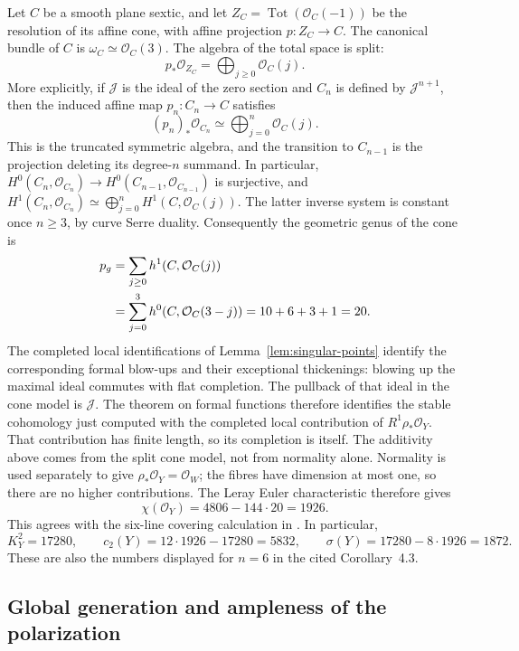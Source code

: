 \documentclass[11pt,reqno]{amsart}
\numberwithin{equation}{section}
\theoremstyle{definition}
\theoremstyle{remark}
\newcommand{\OO}{\mathcal O}
\newcommand{\Tot}{\operatorname{Tot}}
\begin{document}
Let $C$ be a smooth plane sextic, and let
$Z_C=\Tot(\OO_C(-1))$ be the resolution of its affine cone, with affine
projection $p:Z_C\to C$. The canonical bundle of $C$ is
$\omega_C\simeq\OO_C(3)$. The algebra of the total space is split:
\[
 p_*\OO_{Z_C}=\bigoplus_{j\geq0}\OO_C(j).
\]
More explicitly, if $\mathcal J$ is the ideal of the zero section and
$C_n$ is defined by $\mathcal J^{n+1}$, then the induced affine map
$p_n:C_n\to C$ satisfies
\[
 (p_n)_*\OO_{C_n}\simeq\bigoplus_{j=0}^{n}\OO_C(j).
\]
This is the truncated symmetric algebra, and the transition to $C_{n-1}$
is the projection deleting its degree-$n$ summand. In particular,
$H^0(C_n,\OO_{C_n})\to H^0(C_{n-1},\OO_{C_{n-1}})$ is surjective,
and
$H^1(C_n,\OO_{C_n})\simeq\bigoplus_{j=0}^{n}H^1(C,\OO_C(j))$.
The latter inverse system is constant once $n\geq3$, by curve Serre
duality. Consequently the geometric genus of the cone is
\begin{align}\label{eq:pg}
 p_g&=\sum_{j\geq0}h^1(C,\OO_C(j))\notag\\
    &=\sum_{j=0}^3h^0(C,\OO_C(3-j))
      =10+6+3+1=20.
\end{align}
The completed local identifications of
Lemma~\ref{lem:singular-points} identify the corresponding formal
blow-ups and their exceptional thickenings: blowing up the maximal ideal
commutes with flat completion. The pullback of that ideal in the cone
model is $\mathcal J$. The theorem on formal functions
\cite[Chapter III, Theorem 11.1]{Hartshorne1977} therefore identifies the
stable cohomology just computed with the completed local contribution
of $R^1\rho_*\OO_Y$. That contribution has finite length, so its
completion is itself. The additivity above comes from the split cone
model, not from normality alone.
Normality is used separately to give $\rho_*\OO_Y=\OO_W$; the fibres
have dimension at most one, so there are no higher contributions. The Leray Euler characteristic
therefore gives
\begin{equation}\label{eq:chiY}
 \chi(\OO_Y)=4806-144\cdot20=1926.
\end{equation}
This agrees with the six-line covering calculation in
\cite[Remark 4.2 and Corollary 4.3]{Anghel2026}. In particular,
\[
 K_Y^2=17280,\qquad c_2(Y)=12\cdot1926-17280=5832,\qquad
 \sigma(Y)=17280-8\cdot1926=1872.
\]
These are also the numbers displayed for $n=6$ in the cited
Corollary~4.3.

\subsection{Global generation and ampleness of the polarization}
\end{document}
